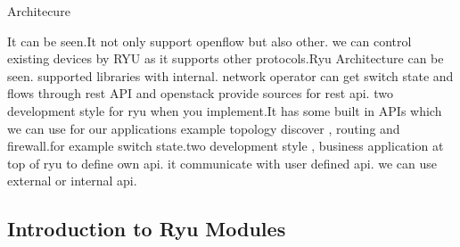 Architecure 

It can be seen.It not only support openflow but also other. we can control existing devices by RYU as it supports other protocols.Ryu Architecture can be seen.  supported libraries with internal. network operator can get switch state and flows through rest API and openstack provide sources for rest api. two development style for ryu when you implement.It has some built in APIs which we can use for our applications example topology discover , routing and firewall.for example switch state.two development style , business application at top of ryu to define own api. it communicate with user defined api. we can use external or internal api.


\subsection{Introduction to Ryu Modules}

